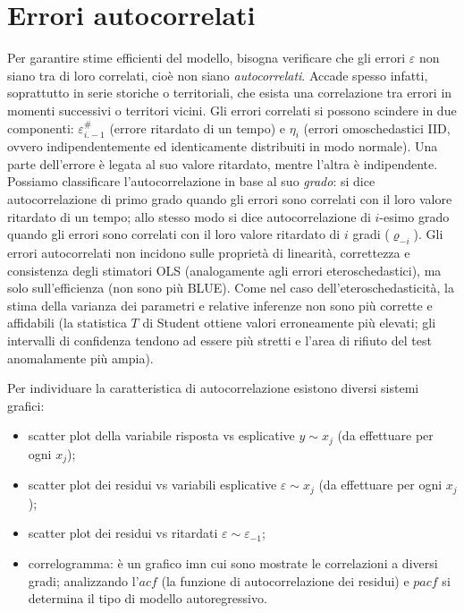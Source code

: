 \documentclass[a4page, 11pt]{article} %
\begin{document}
\section{Errori autocorrelati}
Per garantire stime efficienti del modello, bisogna verificare che gli errori $\varepsilon$ non siano tra di loro correlati, cioè non siano \textit{autocorrelati}.
Accade spesso infatti, soprattutto in serie storiche o territoriali, che esista una correlazione tra errori in momenti successivi o territori vicini.
Gli errori correlati si possono scindere in due componenti: %
$\varepsilon_{i.-1}^\#$ (errore ritardato di un tempo) e $\eta_i$ (errori omoschedastici IID, ovvero indipendentemente ed identicamente distribuiti in modo normale).
Una parte dell'errore è legata al suo valore ritardato, mentre l'altra è indipendente.
Possiamo classificare l’autocorrelazione in base al suo \textit{grado}: si dice autocorrelazione di primo grado quando gli errori sono correlati con il loro valore ritardato di un tempo; allo stesso modo si dice autocorrelazione di $i$-esimo grado quando gli errori sono correlati con il loro valore ritardato di $i$ gradi ($\varrho_{-i}$).
Gli errori autocorrelati non incidono sulle proprietà di linearità, correttezza e consistenza degli stimatori OLS (analogamente agli errori eteroschedastici), ma solo sull’efficienza (non sono più BLUE).
Come nel caso dell’eteroschedasticità, la stima della varianza dei parametri e relative inferenze non sono più corrette e affidabili (la statistica $T$ di Student ottiene valori erroneamente più elevati; gli intervalli di confidenza tendono ad essere più stretti e l'area di rifiuto del test anomalamente più ampia).

Per individuare la caratteristica di autocorrelazione esistono diversi sistemi grafici:
\begin{itemize}[noitemsep]
  \item scatter plot della variabile risposta vs esplicative $y \sim x_j$ (da effettuare per ogni $x_j$);
  \item scatter plot dei residui vs variabili esplicative $\varepsilon \sim x_j$ (da effettuare per ogni $x_j$);
  \item scatter plot dei residui vs ritardati $\varepsilon \sim \varepsilon_{-1}$;
  \item correlogramma: è un grafico imn cui sono mostrate le correlazioni a diversi gradi; analizzando l'$acf$ (la funzione di autocorrelazione dei residui) e $pacf$ si determina il tipo di modello autoregressivo.
\end{itemize}
\end{document}
